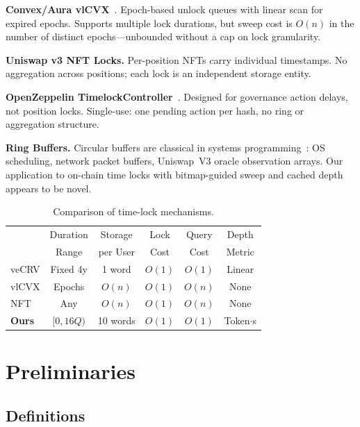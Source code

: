\documentclass[10pt,a4paper,twocolumn]{article}
\begin{document}
\textbf{Convex/Aura vlCVX}~\cite{convex}. Epoch-based unlock queues with linear scan for expired epochs. Supports multiple lock durations, but sweep cost is $O(n)$ in the number of distinct epochs---unbounded without a cap on lock granularity.

\textbf{Uniswap v3 NFT Locks.} Per-position NFTs carry individual timestamps. No aggregation across positions; each lock is an independent storage entity.

\textbf{OpenZeppelin TimelockController}~\cite{oz-timelock}. Designed for governance action delays, not position locks. Single-use: one pending action per hash, no ring or aggregation structure.

\textbf{Ring Buffers.} Circular buffers are classical in systems programming~\cite{ring-buffer}: OS scheduling, network packet buffers, Uniswap~V3 oracle observation arrays. Our application to on-chain time locks with bitmap-guided sweep and cached depth appears to be novel.

\begin{table}[htbp]
\centering
\caption{Comparison of time-lock mechanisms.}
\label{tab:comparison}
\small
\begin{tabular*}{0.95\columnwidth}{@{\extracolsep{\fill}}lccccc@{}}
\toprule
& Duration & Storage & Lock & Query & Depth \\
& Range & per User & Cost & Cost & Metric \\
\midrule
veCRV & Fixed 4y & 1 word & $O(1)$ & $O(1)$ & Linear \\
vlCVX & Epochs & $O(n)$ & $O(1)$ & $O(n)$ & None \\
NFT & Any & $O(n)$ & $O(1)$ & $O(n)$ & None \\
\textbf{Ours} & $[0,16Q)$ & 10 words & $O(1)$ & $O(1)$ & Token$\cdot$s \\
\bottomrule
\end{tabular*}
\end{table}

\section{Preliminaries}
\label{sec:preliminaries}

\subsection{Definitions}
\label{subsec:definitions}
\end{document}
